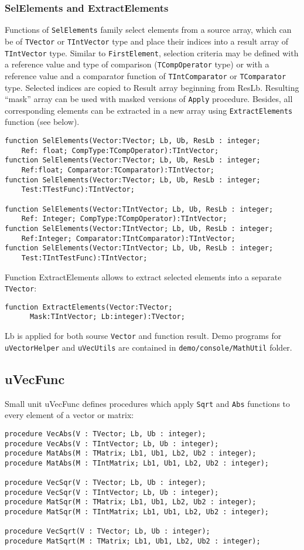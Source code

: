 \documentclass[12pt,a4paper,oneside]{article}
\newcommand{\code}[1]{\texttt{#1}}
\begin{document}
\subsubsection{SelElements and ExtractElements}
Functions of \code{SelElements} family select elements from a source array, which can be of \code{TVector} or \code{TIntVector} type and place their indices into a result array of \code{TIntVector} type. Similar to \code{FirstElement}, selection criteria may be defined with a reference value and type of comparison (\code{TCompOperator} type) or with a reference value and a comparator function of \code{TIntComparator} or \code{TComparator} type.
Selected indices are copied to Result array beginning from ResLb.
Resulting ``mask'' array can be used with masked versions of \code{Apply} procedure. Besides, all corresponding elements can be extracted in a new array using \code{ExtractElements} function (see below).

\begin{verbatim}
function SelElements(Vector:TVector; Lb, Ub, ResLb : integer;
    Ref: float; CompType:TCompOperator):TIntVector;
function SelElements(Vector:TVector; Lb, Ub, ResLb : integer;
    Ref:float; Comparator:TComparator):TIntVector;
function SelElements(Vector:TVector; Lb, Ub, ResLb : integer;
    Test:TTestFunc):TIntVector;

function SelElements(Vector:TIntVector; Lb, Ub, ResLb : integer; 
    Ref: Integer; CompType:TCompOperator):TIntVector; 
function SelElements(Vector:TIntVector; Lb, Ub, ResLb : integer;
    Ref:Integer; Comparator:TIntComparator):TIntVector;
function SelElements(Vector:TIntVector; Lb, Ub, ResLb : integer;
    Test:TIntTestFunc):TIntVector;
\end{verbatim}

Function ExtractElements allows to extract selected elements into a separate \code{TVector}:
\begin{verbatim}
function ExtractElements(Vector:TVector; 
      Mask:TIntVector; Lb:integer):TVector;
\end{verbatim}
Lb is applied for both sourse \code{Vector} and function result.
Demo programs for \code{uVectorHelper} and \code{uVecUtils}  are contained in \code{demo/console/MathUtil} folder. 
\subsection{uVecFunc}
Small unit uVecFunc defines procedures which apply \code{Sqrt} and \code{Abs} functions to every element of a vector or matrix:
\begin{verbatim}
procedure VecAbs(V : TVector; Lb, Ub : integer);
procedure VecAbs(V : TIntVector; Lb, Ub : integer);
procedure MatAbs(M : TMatrix; Lb1, Ub1, Lb2, Ub2 : integer);
procedure MatAbs(M : TIntMatrix; Lb1, Ub1, Lb2, Ub2 : integer);

procedure VecSqr(V : TVector; Lb, Ub : integer);
procedure VecSqr(V : TIntVector; Lb, Ub : integer);
procedure MatSqr(M : TMatrix; Lb1, Ub1, Lb2, Ub2 : integer);
procedure MatSqr(M : TIntMatrix; Lb1, Ub1, Lb2, Ub2 : integer);

procedure VecSqrt(V : TVector; Lb, Ub : integer);
procedure MatSqrt(M : TMatrix; Lb1, Ub1, Lb2, Ub2 : integer);
\end{verbatim}
\end{document}
